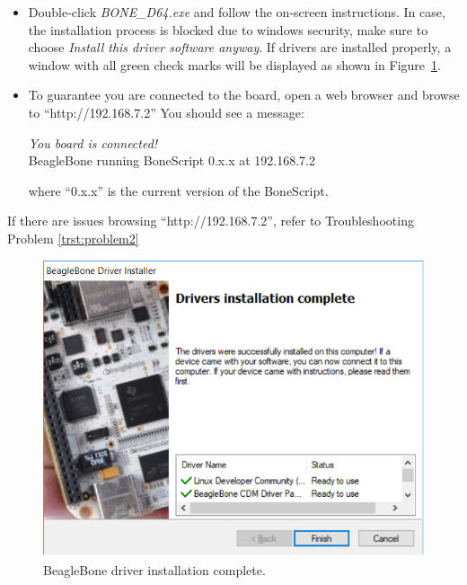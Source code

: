 \begin{mdframed}[frametitle=Install BeagleBone Driver and Browse BeagleBone's webserver, backgroundcolor=yellow!5, roundcorner=7pt,outerlinecolor= blue!70!black,outerlinewidth=1.2]
  \begin{itemize}
  \item   Double-click \emph{BONE\_D64.exe} and follow the on-screen instructions. In case, the installation process is blocked due to windows security, make sure to choose \emph{Install this driver software anyway}. If drivers are installed properly, a window with all green check marks will be displayed as shown in Figure~\ref{fig:BBBlue-DriverInstalation}.
    
  \item To guarantee you are connected to the board, open a web browser and browse to ``http://192.168.7.2'' You should see a message:

    \emph{You board is connected!}\\
    \noindent BeagleBone running BoneScript 0.x.x at 192.168.7.2 

where ``0.x.x'' is the current version of the BoneScript. 
  \end{itemize}
  
\end{mdframed}

If there are issues browsing  ``http://192.168.7.2'', refer to Troubleshooting Problem \ref{trst:problem2}

  \begin{figure}
    \centering
    \includegraphics[scale=0.5]{figs/img/Lab0/BBB-DriverInstalation}
    \caption{BeagleBone driver installation complete.}
    \label{fig:BBBlue-DriverInstalation}
  \end{figure}
%


